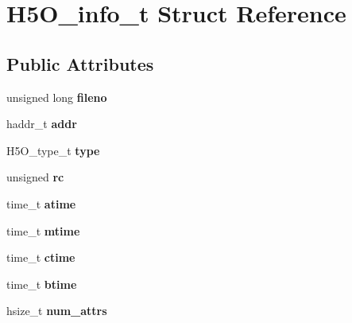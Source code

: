 \hypertarget{struct_h5_o__info__t}{}\section{H5\+O\+\_\+info\+\_\+t Struct Reference}
\label{struct_h5_o__info__t}
\subsection*{Public Attributes}
\begin{DoxyCompactItemize}
\item 
\mbox{\label{struct_h5_o__info__t_a8d0e8ccb19fb8ae7b1dc7c98e90ea329}} 
unsigned long {\bfseries fileno}
\item 
\mbox{\label{struct_h5_o__info__t_aadac941e951c40ad914ebc27d62e6813}} 
haddr\+\_\+t {\bfseries addr}
\item 
\mbox{\label{struct_h5_o__info__t_a36e51e09bbd12ee4c2925eca9534e3e0}} 
H5\+O\+\_\+type\+\_\+t {\bfseries type}
\item 
\mbox{\label{struct_h5_o__info__t_a007da8c28b2a15eaff0626bd9dee9ce3}} 
unsigned {\bfseries rc}
\item 
\mbox{\label{struct_h5_o__info__t_ac3e7227026e68b19860b4f50cdb06b79}} 
time\+\_\+t {\bfseries atime}
\item 
\mbox{\label{struct_h5_o__info__t_a114e1ff44131f1ed6ab70573bc934053}} 
time\+\_\+t {\bfseries mtime}
\item 
\mbox{\label{struct_h5_o__info__t_a1c352603a63bfcbff249a06db3a647ec}} 
time\+\_\+t {\bfseries ctime}
\item 
\mbox{\label{struct_h5_o__info__t_ad2187e0d10d9c4cecce83f53c5cc055b}} 
time\+\_\+t {\bfseries btime}
\item 
\mbox{\label{struct_h5_o__info__t_a4fa1fe21270e686bd822ef1f0f042265}} 
hsize\+\_\+t {\bfseries num\+\_\+attrs}
\item 
\mbox{\label{struct_h5_o__info__t_a4a0bdaeb221f1fe38af858d55459c3c1}} 

\end{DoxyCompactItemize}
